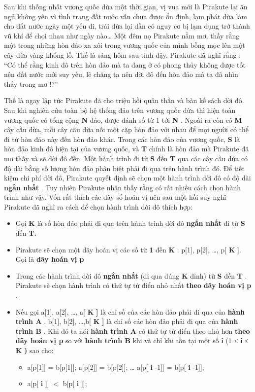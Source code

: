 Sau khi thống nhất vương quốc dừa một thời gian, vị vua mới là Pirakute lại ăn ngủ không yên vì tình trạng đất nước vẫn chưa được ổn định, lạm phát dừa làm cho đất nước ngày một yếu đi, trái dừa lại dần có nguy cơ bị lạm dụng trở thành vũ khí để chọi nhau như ngày nào… Một đêm nọ Pirakute nằm mơ, thấy rằng một trong những hòn đảo xa xôi trong vương quốc của mình bỗng mọc lên một cây dừa vàng khổng lồ. Thế là sáng hôm sau tỉnh dậy, Pirakute đã nghĩ rằng : “Có thể rằng kinh đô trên hòn đảo mà ta đang ở có phong thủy không được tốt nên đất nước mới suy yếu, lẽ chăng ta nên dời đô đến hòn đảo mà ta đã nhìn thấy trong mơ !?”

Thế là ngay lập tức Pirakute đã cho triệu hồi quân thần và bàn kế sách dời đô. Sau khi nghiên cứu toàn bộ hệ thống đảo trên vương quốc dừa thì hiện toàn vương quốc có tổng cộng \textbf{ N } đảo, được đánh số từ 1 tới \textbf{ N } . Ngoài ra còn có \textbf{ M } cây cầu dừa, mỗi cây cầu dừa nối một cặp hòn đảo với nhau để mọi người có thể đi từ hòn đảo này đến hòn đảo khác. Trong các hòn đảo của vương quốc, \textbf{ S } là hòn đảo kinh đô hiện tại của vương quốc, và \textbf{ T } chính là hòn đảo mà Pirakute đã mơ thấy và sẽ dời đô đến. Một hành trình đi từ \textbf{ S } đến \textbf{ T } qua các cây cầu dừa có độ dài bằng số lượng hòn đảo phân biệt phải đi qua trên hành trình đó. Để tiết kiệm chi phí dời đô, Pirakute quyết định sẽ chọn một hành trình dời đô có độ dài \textbf{ ngắn nhất } . Tuy nhiên Pirakute nhận thấy rằng có rất nhiều cách chọn hành trình như vậy. Vốn rất thích các dãy số hoán vị nên sau một hồi suy nghĩ Pirakute đã nghĩ ra cách để chọn hành trình dời đô thích hợp:
\begin{itemize}
	\item Gọi \textbf{ K } là số hòn đảo phải đi qua trên hành trình dời đô \textbf{ ngắn nhất } đi từ \textbf{ S } đến \textbf{ T. }
	\item Pirakute sẽ chọn một dãy hoán vị các số từ \textbf{ 1 } đến \textbf{ K } : p[1], p[2], …, p[ \textbf{ K } ]. Gọi là \textbf{ dãy hoán vị p }
	\item Trong các hành trình dời đô \textbf{ ngắn nhất } (đi qua đúng \textbf{ K } đỉnh) từ \textbf{ S } đến \textbf{ T } . Pirakute sẽ chọn hành trình có thứ tự từ điển nhỏ nhất \textbf{ theo }\textbf{ dãy hoán vị p } .
	\item Nếu gọi a[1], a[2], …, a[ \textbf{ K }\textbf{ ] } là chỉ số của các hòn đảo phải đi qua của \textbf{ hành trình A } . b[1], b[2], …,b[ \textbf{ K }\textbf{ ] }\textbf{} là chỉ số các hòn đảo phải đi qua của \textbf{ hành trình B } . Khi đó ta nói \textbf{ hành trình A } có thứ tự từ điển theo nhỏ hơn \textbf{}\textbf{ theo }\textbf{ dãy hoán vị p } so với \textbf{ hành trình B } khi và chỉ khi tồn tại một số \textbf{ i } (1 ≤ \textbf{ i } ≤ \textbf{ K }\textbf{ ) }\textbf{} sao cho:
\begin{itemize}
	\item a[p[1]] = b[p[1]]; a[p[2]] = b[p[2]]; … a[p[ \textbf{ i } -1]] = b[p[ \textbf{ i } -1]];
\end{itemize}
\begin{itemize}
	\item a[p[ \textbf{ i } ]] $<$ b[p[ \textbf{ i } ]];
\end{itemize}
\end{itemize}
